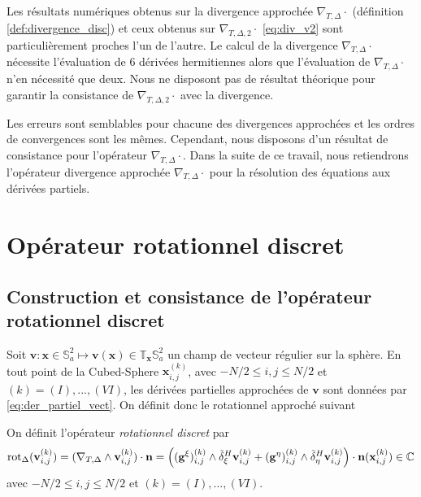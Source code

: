 Les résultats numériques obtenus sur la divergence approchée $\nabla_{T,\Delta} \cdot$ (définition \ref{def:divergence_disc}) et ceux obtenus sur $\nabla_{T,\Delta,2} \cdot$ \eqref{eq:div_v2} sont particulièrement proches l'un de l'autre. Le calcul de la divergence $\nabla_{T,\Delta} \cdot$ nécessite l'évaluation de 6 dérivées hermitiennes alors que l'évaluation de $\nabla_{T,\Delta} \cdot$ n'en nécessité que deux. Nous ne disposont pas de résultat théorique pour garantir la consistance de $\nabla_{T,\Delta,2} \cdot$ avec la divergence.

Les erreurs sont semblables pour chacune des divergences approchées et les ordres de convergences sont les mêmes. Cependant, nous disposons d'un résultat de consistance pour l'opérateur $\nabla_{T,\Delta} \cdot$. Dans la suite de ce travail, nous retiendrons l'opérateur divergence approchée $\nabla_{T,\Delta} \cdot$ pour la résolution des équations aux dérivées partiels.























\section{Opérateur rotationnel discret}

\subsection{Construction et consistance de l'opérateur rotationnel discret}


Soit $\mathbf{v} : \mathbf{x} \in \mathbb{S}_a^2 \mapsto \mathbf{v}(\mathbf{x}) \in \mathbb{T}_{\mathbf{x}} \mathbb{S}_a^2$ un champ de vecteur régulier sur la sphère. En tout point de la Cubed-Sphere $\mathbf{x}_{i,j}^{(k)}$, avec $-N/2 \leq i,j \leq N/2$ et $(k) = (I), ..., (VI)$, les dérivées partielles approchées de $\mathbf{v}$ sont données par \eqref{eq:der_partiel_vect}. On définit donc le rotationnel approché suivant

\begin{definition}
On définit l'opérateur \textit{rotationnel discret} par 
\begin{equation}
\text{rot}_{\Delta} (\mathbf{v}_{i,j}^{(k)}) = (\nabla_{T,\Delta} \wedge \mathbf{v}_{i,j}^{(k)}) \cdot \mathbf{n} = \left( ( \mathbf{g}^{\xi} )_{i,j}^{(k)} \wedge \tilde{\delta}^H_{\xi} \mathbf{v}_{i,j}^{(k)}   + ( \mathbf{g}^{\eta} )_{i,j}^{(k)} \wedge \tilde{\delta}^H_{\eta} \mathbf{v}_{i,j}^{(k)} \right) \cdot \mathbf{n}(\mathbf{x}_{i,j}^{(k)}) \in \mathbb{C}
\end{equation}
avec $-N/2 \leq i,j \leq N/2$ et $(k) = (I), \ldots , (VI)$.
\label{def:rotationnel_disc}
\end{definition}

